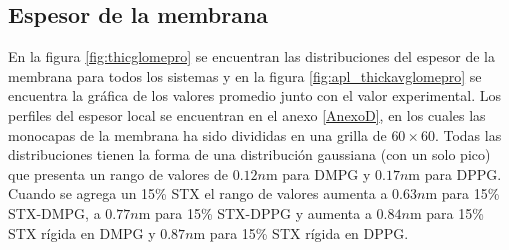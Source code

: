 \subsection{Espesor de la membrana}

En la figura \ref{fig:thicglomepro} se encuentran las distribuciones del espesor de la membrana para todos los sistemas y en la figura \ref{fig:apl_thickavglomepro} se encuentra la gr\'{a}fica de los valores promedio junto con el valor experimental. Los perfiles del espesor local se encuentran en el anexo \ref{AnexoD}, en los cuales las monocapas de la membrana ha sido divididas en una grilla de $60\times 60$.  Todas las distribuciones tienen la forma de una distribuci\'{o}n gaussiana (con un solo pico) que presenta un rango de valores de $0.12n$m para DMPG y $0.17n$m para DPPG. Cuando se agrega un 15\% STX el rango de valores aumenta a $0.63n$m para 15\% STX-DMPG, a $0.77n$m para 15\% STX-DPPG y aumenta a $0.84n$m para 15\% STX r\'{i}gida en DMPG y $0.87n$m para 15\% STX r\'{i}gida en DPPG.\\

